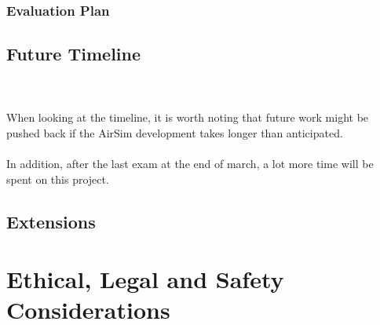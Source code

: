 \documentclass[12pt,oneside]{report}
\begin{document}
\subsection{Evaluation Plan}

\pagebreak
\section{Future Timeline} \label{timeline}

\\~\\
When looking at the timeline, it is worth noting that future work might be pushed back if the AirSim development takes longer than anticipated. 
\\~\\
In addition, after the last exam at the end of march, a lot more time will be spent on this project. 
\pagebreak
\section{Extensions}\label{Extensions}


\chapter{Ethical, Legal and Safety Considerations}



\newpage

\end{document}
